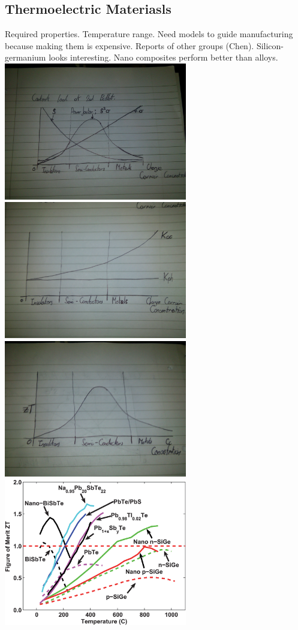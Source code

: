 \documentclass[twocolumn]{article}
\begin{document}
\subsection{Thermoelectric Materiasls}
\label{sec:Thermoelectric Materials}
Required properties. Temperature range. Need models to guide manufacturing because making them is expensive. Reports of other groups (Chen). Silicon-germanium looks interesting. Nano composites perform better than alloys.
\includegraphics[width=80mm]{Roughpowerfactor.jpg}
\includegraphics[width=80mm]{kphindependentofcc.jpg}
\includegraphics[width=80mm]{ZTvsccc.jpg}
\includegraphics[width=80mm]{Chen.png}
\end{document}
